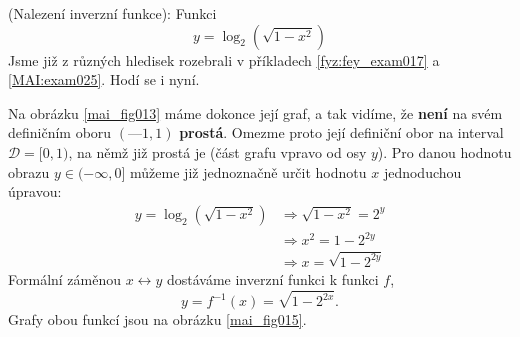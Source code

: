 \wikitextrule
\begin{example}\label{MAI:exam027}
  (Nalezení inverzní funkce): Funkci 
  \begin{equation*}
    y = \log_2(\sqrt{1-x^2})
  \end{equation*}
   Jsme již z různých hledisek rozebrali v příkladech \ref{fyz:fey_exam017} a \ref{MAI:exam025}. 
   Hodí se i nyní.

  {\centering
   \captionsetup{type=figure}
   
  \par}
  
   Na obrázku \ref{mai_fig013} máme dokonce její graf, a tak vidíme, že \textbf{není} na svém 
   definičním oboru \((—1, 1)\) \textbf{prostá}. Omezme proto její definiční obor na interval 
   \( \mathcal{D} = [0, 1)\), na němž již prostá je (část grafu vpravo od osy \(y\)). Pro danou 
   hodnotu obrazu \(y \in (-\infty,0]\) můžeme již jednoznačně určit hodnotu \(x\) jednoduchou 
   úpravou:
   \begin{align*}
     y = \log_2(\sqrt{1-x^2}) &\Rightarrow \sqrt{1-x^2} = 2^y   \\
                              &\Rightarrow x^2 = 1 - 2^{2y}     \\
                              &\Rightarrow x = \sqrt{1 - 2^{2y}}
   \end{align*}
   Formální záměnou \(x \leftrightarrow y\) dostáváme inverzní funkci k funkci \(f\),
   \begin{equation*}
     y =f^{-1}(x) = \sqrt{1 - 2^{2x}}.
   \end{equation*}
   Grafy obou funkcí jsou na obrázku \ref{mai_fig015}.
\end{example}















